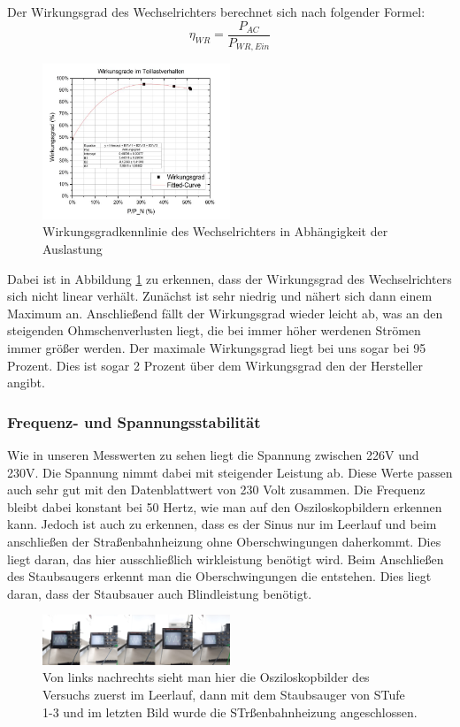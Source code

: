 Der Wirkungsgrad des Wechselrichters berechnet sich nach folgender Formel:
%
\begin{equation}
	\eta_{ WR} = \frac{ P_{AC} }{ P_{WR,Ein} }
\end{equation}
%
%
\begin{figure}[!h]
		\centering
		\includegraphics[width=0.5\textwidth]{Abbildungen/Kennlinie wr}
		\caption{Wirkungsgradkennlinie des Wechselrichters in Abhängigkeit der Auslastung}
		\label{fig:WRkennlinie}
\end{figure}
%
Dabei ist in Abbildung \ref{fig:WRkennlinie} zu erkennen, dass der Wirkungsgrad des Wechselrichters sich nicht linear verhält. Zunächst ist sehr niedrig und nähert sich dann einem Maximum an. Anschließend fällt der Wirkungsgrad wieder leicht ab, was an den steigenden Ohmschenverlusten liegt, die bei immer höher werdenen Strömen immer größer werden. Der maximale Wirkungsgrad liegt bei uns sogar bei 95 Prozent. Dies ist sogar 2 Prozent über dem Wirkungsgrad den der Hersteller angibt.
\subsubsection{Frequenz- und Spannungsstabilität}
Wie in unseren Messwerten zu sehen liegt die Spannung zwischen 226V und 230V. Die Spannung nimmt dabei mit steigender Leistung ab. Diese Werte passen auch sehr gut mit den Datenblattwert von 230 Volt zusammen. Die Frequenz bleibt dabei konstant bei 50 Hertz, wie man auf den Osziloskopbildern erkennen kann. Jedoch ist auch zu erkennen, dass es der Sinus nur im Leerlauf und beim anschließen der Straßenbahnheizung ohne Oberschwingungen daherkommt. Dies liegt daran, das hier ausschließlich wirkleistung benötigt wird. Beim Anschließen des Staubsaugers erkennt man die Oberschwingungen die entstehen. Dies liegt daran, dass der Staubsauer auch Blindleistung benötigt.
%
\begin{figure}[!h]
		\centering
		\includegraphics[width=0.5\textwidth]{Abbildungen/MergedImages}
		\caption{Von links nachrechts sieht man hier die Osziloskopbilder des Versuchs zuerst im Leerlauf, dann mit dem Staubsauger von STufe 1-3 und im letzten Bild wurde die STrßenbahnheizung angeschlossen.}
		\label{fig:oszi}
\end{figure}
%
